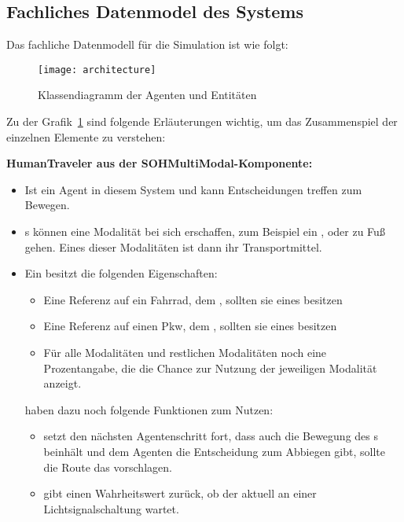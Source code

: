 %

\subsection{Fachliches Datenmodel des Systems}\label{subsec:data-model}

Das fachliche Datenmodell für die Simulation ist wie folgt:

\begin{figure}[h]
    \centering
    \texttt{[image: architecture]}
    \caption{Klassendiagramm der Agenten und Entitäten}
    \label{fig:class-diagramm}
\end{figure}

Zu der Grafik~\ref{fig:class-diagramm} sind folgende Erläuterungen wichtig, um das Zusammenspiel der einzelnen Elemente zu verstehen:

\textbf{HumanTraveler aus der SOHMultiModal-Komponente:}
\begin{itemize}
    \item Ist ein Agent in diesem System und kann Entscheidungen treffen zum Bewegen.
    \item {}s können eine Modalität bei sich erschaffen, zum Beispiel ein ,  oder zu Fuß gehen.
    Eines dieser Modalitäten ist dann ihr Transportmittel.
    \item Ein  besitzt die folgenden Eigenschaften:
    \begin{itemize}
        \item Eine Referenz auf ein Fahrrad, dem , sollten sie eines besitzen
        \item Eine Referenz auf einen Pkw, dem , sollten sie eines besitzen
        \item Für alle Modalitäten und restlichen Modalitäten noch eine Prozentangabe, die die Chance zur Nutzung der jeweiligen Modalität anzeigt.
    \end{itemize}
     haben dazu noch folgende Funktionen zum Nutzen:
    \begin{itemize}
        \item {} setzt den nächsten Agentenschritt fort, dass auch die Bewegung des s beinhält und dem Agenten die Entscheidung zum Abbiegen gibt, sollte die Route das vorschlagen.
        \item {} gibt einen Wahrheitswert zurück, ob der  aktuell an einer Lichtsignalschaltung wartet.
    \end{itemize}
\end{itemize}

